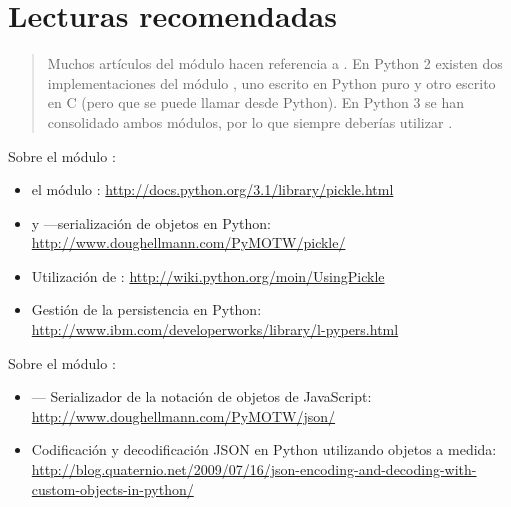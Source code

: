 \section{Lecturas recomendadas}

\begin{quote}
Muchos artículos del módulo  hacen referencia a . En Python 2 existen dos implementaciones del módulo , uno escrito en Python puro y otro escrito en C (pero que se puede llamar desde Python). En Python 3 se han consolidado ambos módulos, por lo que siempre deberías utilizar . 
\end{quote}

Sobre el módulo :

\begin{itemize}

\item el módulo : \newline
\href{http://docs.python.org/3.1/library/pickle.html}{http://docs.python.org/3.1/library/pickle.html}

\item {} y  ---serialización de objetos en Python: \newline
\href{http://www.doughellmann.com/PyMOTW/pickle/}{http://www.doughellmann.com/PyMOTW/pickle/}

\item Utilización de : \newline
\href{http://wiki.python.org/moin/UsingPickle}{http://wiki.python.org/moin/UsingPickle}

\item Gestión de la persistencia en Python: \newline
\href{http://www.ibm.com/developerworks/library/l-pypers.html}{http://www.ibm.com/developerworks/library/l-pypers.html}

\end{itemize}

Sobre el módulo :

\begin{itemize}

\item {} --- Serializador de la notación de objetos de JavaScript: \newline
\href{http://www.doughellmann.com/PyMOTW/json/}{http://www.doughellmann.com/PyMOTW/json/}

\item Codificación y decodificación JSON en Python utilizando objetos a medida: \newline
\href{http://blog.quaternio.net/2009/07/16/json-encoding-and-decoding-with-custom-objects-in-python/}{http://blog.quaternio.net/2009/07/16/json-encoding-and-decoding-with-custom-objects-in-python/}

\end{itemize}

